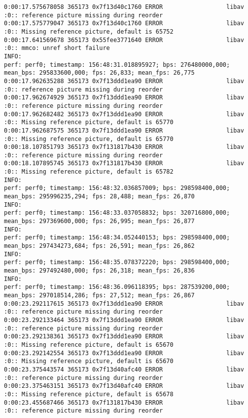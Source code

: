 \documentclass[12pt,oneside]{book}
\begin{document}
\begin{lstlisting}
0:00:17.575678058 365173 0x7f13d40c1760 ERROR                  libav :0:: reference picture missing during reorder
0:00:17.575779047 365173 0x7f13d40c1760 ERROR                  libav :0:: Missing reference picture, default is 65752
0:00:17.641569678 365173 0x55fee3771640 ERROR                  libav :0:: mmco: unref short failure
INFO:
perf: perf0; timestamp: 156:48:31.018895927; bps: 276480000,000; mean_bps: 295833600,000; fps: 26,833; mean_fps: 26,775
0:00:17.962635288 365173 0x7f13ddd1ea90 ERROR                  libav :0:: reference picture missing during reorder
0:00:17.962674929 365173 0x7f13ddd1ea90 ERROR                  libav :0:: reference picture missing during reorder
0:00:17.962682482 365173 0x7f13ddd1ea90 ERROR                  libav :0:: Missing reference picture, default is 65770
0:00:17.962687575 365173 0x7f13ddd1ea90 ERROR                  libav :0:: Missing reference picture, default is 65770
0:00:18.107851793 365173 0x7f131817b430 ERROR                  libav :0:: reference picture missing during reorder
0:00:18.107895745 365173 0x7f131817b430 ERROR                  libav :0:: Missing reference picture, default is 65782
INFO:
perf: perf0; timestamp: 156:48:32.036857009; bps: 298598400,000; mean_bps: 295996235,294; fps: 28,488; mean_fps: 26,870
INFO:
perf: perf0; timestamp: 156:48:33.037058832; bps: 320716800,000; mean_bps: 297369600,000; fps: 26,995; mean_fps: 26,877
INFO:
perf: perf0; timestamp: 156:48:34.052440153; bps: 298598400,000; mean_bps: 297434273,684; fps: 26,591; mean_fps: 26,862
INFO:
perf: perf0; timestamp: 156:48:35.078372220; bps: 298598400,000; mean_bps: 297492480,000; fps: 26,318; mean_fps: 26,836
INFO:
perf: perf0; timestamp: 156:48:36.096118395; bps: 287539200,000; mean_bps: 297018514,286; fps: 27,512; mean_fps: 26,867
0:00:23.292117615 365173 0x7f13ddd1ea90 ERROR                  libav :0:: reference picture missing during reorder
0:00:23.292133464 365173 0x7f13ddd1ea90 ERROR                  libav :0:: reference picture missing during reorder
0:00:23.292138361 365173 0x7f13ddd1ea90 ERROR                  libav :0:: Missing reference picture, default is 65670
0:00:23.292142554 365173 0x7f13ddd1ea90 ERROR                  libav :0:: Missing reference picture, default is 65670
0:00:23.375443574 365173 0x7f13d40afc40 ERROR                  libav :0:: reference picture missing during reorder
0:00:23.375463151 365173 0x7f13d40afc40 ERROR                  libav :0:: Missing reference picture, default is 65678
0:00:23.455687466 365173 0x7f131817b430 ERROR                  libav :0:: reference picture missing during reorder

\end{lstlisting}
\end{document}

